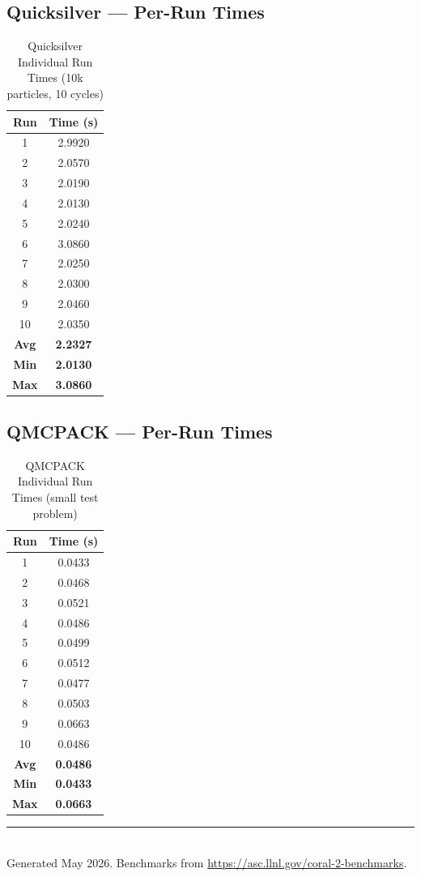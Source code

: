 \documentclass[12pt,a4paper]{article}
\begin{document}
\subsection{Quicksilver --- Per-Run Times}

\begin{table}[H]
\centering
\caption{Quicksilver Individual Run Times (10k particles, 10 cycles)}
\begin{tabular}{cc}
\toprule
\textbf{Run} & \textbf{Time (s)} \\
\midrule
1  & 2.9920 \\ 2  & 2.0570 \\ 3  & 2.0190 \\ 4  & 2.0130 \\ 5  & 2.0240 \\
6  & 3.0860 \\ 7  & 2.0250 \\ 8  & 2.0300 \\ 9  & 2.0460 \\ 10 & 2.0350 \\
\midrule
\textbf{Avg} & \textbf{2.2327} \\
\textbf{Min} & \textbf{2.0130} \\
\textbf{Max} & \textbf{3.0860} \\
\bottomrule
\end{tabular}
\end{table}

\subsection{QMCPACK --- Per-Run Times}

\begin{table}[H]
\centering
\caption{QMCPACK Individual Run Times (small test problem)}
\begin{tabular}{cc}
\toprule
\textbf{Run} & \textbf{Time (s)} \\
\midrule
1  & 0.0433 \\ 2  & 0.0468 \\ 3  & 0.0521 \\ 4  & 0.0486 \\ 5  & 0.0499 \\
6  & 0.0512 \\ 7  & 0.0477 \\ 8  & 0.0503 \\ 9  & 0.0663 \\ 10 & 0.0486 \\
\midrule
\textbf{Avg} & \textbf{0.0486} \\
\textbf{Min} & \textbf{0.0433} \\
\textbf{Max} & \textbf{0.0663} \\
\bottomrule
\end{tabular}
\end{table}

\vfill
\noindent\rule{\textwidth}{0.4pt}\\
{\small Generated May 2026. Benchmarks from \url{https://asc.llnl.gov/coral-2-benchmarks}.}
\end{document}
